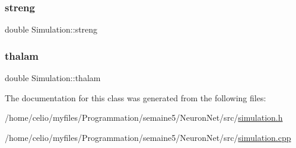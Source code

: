 \mbox{\label{classSimulation_adfda098679d8fcb864ecd87409087d02}} 
\subsubsection{\texorpdfstring{streng}{streng}}
{\footnotesize\ttfamily double Simulation\+::streng\hspace{0.3cm}{\ttfamily [private]}}

\mbox{\label{classSimulation_a7fca2f5f79a662f91736b0e5f30598c1}} 
\subsubsection{\texorpdfstring{thalam}{thalam}}
{\footnotesize\ttfamily double Simulation\+::thalam\hspace{0.3cm}{\ttfamily [private]}}



The documentation for this class was generated from the following files\+:\begin{DoxyCompactItemize}
\item 
/home/celio/myfiles/\+Programmation/semaine5/\+Neuron\+Net/src/\hyperlink{simulation_8h}{simulation.\+h}\item 
/home/celio/myfiles/\+Programmation/semaine5/\+Neuron\+Net/src/\hyperlink{simulation_8cpp}{simulation.\+cpp}\end{DoxyCompactItemize}
